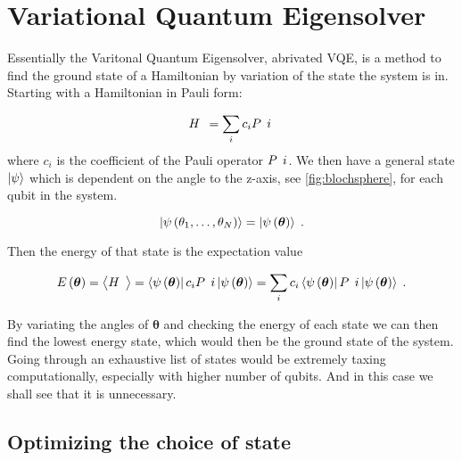 \section{Variational Quantum Eigensolver}

Essentially the Varitonal Quantum Eigensolver, abrivated VQE, is a method to find the ground state of a Hamiltonian by variation of the state the system is in. Starting with a Hamiltonian in Pauli form:

\begin{equation}
\op{H} = \sum_i c_i \op{P}{i} \;
\end{equation}
where $c_i$ is the coefficient of the Pauli operator $\op{P}{i}$. We then have a general state $\ket{\psi}$ which is dependent on the angle to the z-axis, see \ref{fig:blochsphere}, for each qubit in the system.

\begin{equation}
   \ket{\psi \left ( \theta_1, \dots, \theta_N \right )} = \ket{\psi \left ( \boldsymbol{\theta} \right )} \; .
\end{equation}

Then the energy of that state is the expectation value

\begin{equation}
    E\left ( \boldsymbol{\theta} \right ) = \left < \op{H} \right > = \bra{\psi \left ( \boldsymbol{\theta} \right )} c_i \op{P}{i} \ket{\psi \left ( \boldsymbol{\theta} \right )} = \sum_i c_i \bra{\psi \left ( \boldsymbol{\theta} \right )} \op{P}{i} \ket{\psi \left ( \boldsymbol{\theta} \right )} \; .
\end{equation}

By variating the angles of $\boldsymbol{\theta}$ and checking the energy of each state we can then find the lowest energy state, which would then be the ground state of the system. Going through an exhaustive list of states would be extremely taxing computationally, especially with higher number of qubits. And in this case we shall see that it is unnecessary.

\subsection{Optimizing the choice of state}

